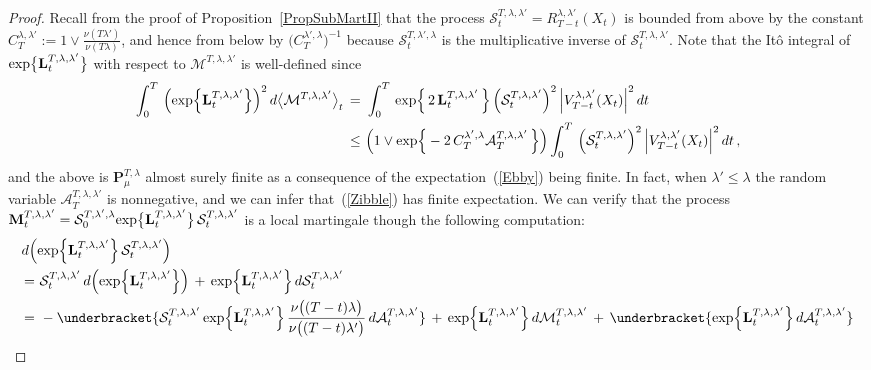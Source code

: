 \documentclass[10pt]{article}
\numberwithin{equation}{section}
\theoremstyle{definition}
\begin{document}
\begin{proof}  Recall from  the proof of Proposition~\ref{PropSubMartII} that the process $\mathcal{S}^{T,\lambda,\lambda'}_t=R_{T-t}^{\lambda,\lambda'}(X_t)$ is bounded from above by the constant $C_T^{\lambda,\lambda'}:=1\vee \frac{\nu(T\lambda')  }{\nu(T\lambda )}  $, and hence from below by $\big(C_T^{\lambda',\lambda}\big)^{-1}$ because $\mathcal{S}^{T,\lambda',\lambda}_t$ is the multiplicative inverse of $\mathcal{S}^{T,\lambda,\lambda'}_t$. Note that the It\^o  integral of $\textup{exp}\big\{\mathbf{L}_{t}^{T,\lambda ,\lambda'}  \big\}$ with respect to $\mathcal{M}^{T,\lambda ,\lambda'}$ is well-defined since
\begin{align}\label{Zibble}
    \int_0^{T} \,\Big( \textup{exp}\Big\{\mathbf{L}_{t}^{T,\lambda ,\lambda'}  \Big\}\Big)^2 \,  d  \big\langle \mathcal{M}^{T,\lambda ,\lambda'}\big\rangle_t \,=\,&\, \int_0^{T}\,\textup{exp}\Big\{\,2\,\mathbf{L}_{t}^{T,\lambda ,\lambda'}  \,\Big\} \,\Big(\mathcal{S}^{T,\lambda,\lambda'}_t\Big)^2\,\Big|  V^{\lambda,\lambda'}_{T-t}(X_t) \Big|^2\,dt \nonumber   \\
    \,\leq \,&\, \Big(1\vee \textup{exp}\Big\{- 2\,C_T^{\lambda',\lambda}   \mathcal{A}^{T,\lambda,\lambda'}_T \,\Big\}\Big)  \int_0^{T} \,\Big(\mathcal{S}^{T,\lambda,\lambda'}_t\Big)^2\,\Big|  V^{\lambda,\lambda'}_{T-t}(X_t) \Big|^2\,dt \,, 
\end{align}
and the above is $\mathbf{P}_{\mu}^{T,\lambda} $ almost surely finite as a consequence of the expectation~(\ref{Ebby}) being finite.  In fact, when $\lambda'\leq \lambda$ the random variable $\mathcal{A}^{T,\lambda,\lambda'}_T $ is nonnegative, and we can infer that~(\ref{Zibble}) has finite expectation.   We can verify  that the process $\mathbf{M}^{T,\lambda,\lambda'}_t=\mathcal{S}_{0}^{T,\lambda' ,\lambda}\textup{exp}\big\{\mathbf{L}_{t}^{T,\lambda ,\lambda'}  \big\}\,\mathcal{S}_{t}^{T,\lambda ,\lambda'}$ is a local martingale though the following computation: 
\begin{align}  \label{Itoy}
 d\Big(&\textup{exp}\Big\{\mathbf{L}_{t}^{T,\lambda ,\lambda'}  \Big\}\,\mathcal{S}_{t}^{T,\lambda ,\lambda'}\Big) \nonumber  \\ \,=\,&\,\mathcal{S}_{t}^{T,\lambda,\lambda'} \, d\Big(\textup{exp}\Big\{\mathbf{L}_{t}^{T,\lambda ,\lambda'}  \Big\}\Big)\,+\,  \textup{exp}\Big\{\mathbf{L}_{t}^{T,\lambda,\lambda'}  \Big\}\,d\mathcal{S}_{t}^{T,\lambda,\lambda'} \nonumber  \\
\,=\,& \,-\underbracket{\mathcal{S}_{t}^{T,\lambda,\lambda'}\,\textup{exp}\Big\{\mathbf{L}_{t}^{T,\lambda,\lambda'}  \Big\}\,\frac{\nu\big((T-t)\lambda \big)  }{\nu\big((T-t)\lambda' \big)  }\,d\mathcal{A}_{t}^{T,\lambda,\lambda'}}  \,+\,  \textup{exp}\Big\{\mathbf{L}_{t}^{T,\lambda,\lambda'}  \Big\}\,d\mathcal{M}_{t}^{T,\lambda,\lambda'}\,+\, \underbracket{\textup{exp}\Big\{\mathbf{L}_{t}^{T,\lambda,\lambda'}  \Big\}\,d\mathcal{A}_{t}^{T,\lambda,\lambda'}} \nonumber  \\

\end{align}
\end{proof}
\end{document}
